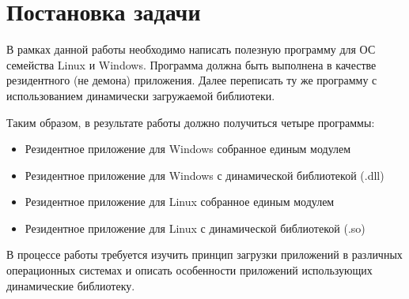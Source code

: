 \newpage
\section*{Постановка задачи}

\vspace{2em}

В рамках данной работы необходимо написать полезную программу для ОС семейства Linux и Windows.
Программа должна быть выполнена в качестве резидентного (не демона) приложения.
Далее переписать ту же программу с использованием динамически загружаемой библиотеки.

Таким образом, в результате работы должно получиться четыре программы:
\begin{itemize}
\item Резидентное приложение для Windows собранное единым модулем
\item Резидентное приложение для Windows с динамической библиотекой (.dll)
\item Резидентное приложение для Linux собранное единым модулем
\item Резидентное приложение для Linux с динамической библиотекой (.so)
\end{itemize}

\vspace{1em}

В процессе работы требуется изучить принцип загрузки приложений в различных операционных системах и описать особенности приложений использующих динамические библиотеку.
